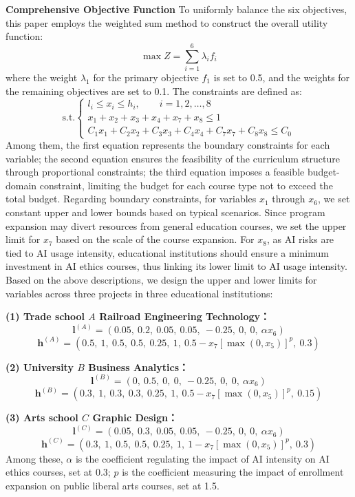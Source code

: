 \documentclass{mcmthesis}
\begin{document}
\noindent\textbf{Comprehensive Objective Function}
To uniformly balance the six objectives, this paper employs the weighted sum method to construct the overall utility function:
\begin{equation}
\max Z=\sum_{i=1}^{6}\lambda_i f_i
\end{equation}
where the weight $\lambda_1$ for the primary objective $f_1$ is set to 0.5, and the weights for the remaining objectives are set to 0.1.
The constraints are defined as:
\begin{equation}
\text{s.t.}
\begin{cases}
l_i\le x_i\le h_i,\qquad i=1,2,\dots,8 \\
x_1+x_2+x_3+x_4+x_7+x_8\le 1\\
C_1x_1+C_2x_2+C_3x_3+C_4x_4+C_7x_7+C_8x_8\le C_0
\end{cases}
\end{equation}
Among them, the first equation represents the boundary constraints for each variable; the second equation ensures the feasibility of the curriculum structure through proportional constraints; the third equation imposes a feasible budget-domain constraint, limiting the budget for each course type not to exceed the total budget. Regarding boundary constraints, for variables $x_1$ through $x_6$, we set constant upper and lower bounds based on typical scenarios. Since program expansion may divert resources from general education courses, we set the upper limit for $x_7$ based on the scale of the course expansion. For $x_8$, as AI risks are tied to AI usage intensity, educational institutions should ensure a minimum investment in AI ethics courses, thus linking its lower limit to AI usage intensity. Based on the above descriptions, we design the upper and lower limits for variables across three projects in three educational institutions:

\medskip
\noindent\textbf{(1) Trade school $A$ Railroad Engineering Technology：}
\[
\mathbf{l}^{(A)}=
(0.05,\ 0.2,\ 0.05,\ 0.05,\ -0.25,\ 0,\ 0,\ \alpha x_6)
\]
\[
\mathbf{h}^{(A)}=
(0.5,\ 1,\ 0.5,\ 0.5,\ 0.25,\ 1,\ 0.5-x_7[\max(0,x_5)]^{p},\ 0.3)
\]

\medskip
\noindent\textbf{(2) University $B$ Business Analytics：}
\[
\mathbf{l}^{(B)}=
(0,\ 0.5,\ 0,\ 0,\ -0.25,\ 0,\ 0,\ \alpha x_6)
\]
\[
\mathbf{h}^{(B)}=
(0.3,\ 1,\ 0.3,\ 0.3,\ 0.25,\ 1,\ 0.5-x_7[\max(0,x_5)]^{p},\ 0.15)
\]

\medskip
\noindent\textbf{(3) Arts school $C$ Graphic Design：}
\[
\mathbf{l}^{(C)}=
(0.05,\ 0.3,\ 0.05,\ 0.05,\ -0.25,\ 0,\ 0,\ \alpha x_6)
\]
\[
\mathbf{h}^{(C)}=
(0.3,\ 1,\ 0.5,\ 0.5,\ 0.25,\ 1,\ 1-x_7[\max(0,x_5)]^{p},\ 0.3)
\]
Among these, $\alpha$ is the coefficient regulating the impact of AI intensity on AI ethics courses, set at 0.3; $p$ is the coefficient measuring the impact of enrollment expansion on public liberal arts courses, set at 1.5.
\end{document}
